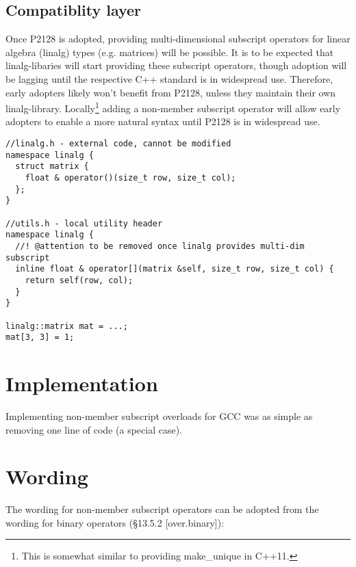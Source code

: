 \subsection{Compatiblity layer}
Once P2128 is adopted, providing multi\hyp dimensional subscript operators for linear algebra (linalg) types (e.g. matrices) will be possible.
It is to be expected that linalg\hyp libaries will start providing these subscript operators, though adoption will be lagging until the respective C++ standard is in widespread use.
Therefore, early adopters likely won't benefit from P2128, unless they maintain their own linalg\hyp library.
Locally\footnote{This is somewhat similar to providing make_unique in C++11.} adding a non\hyp member subscript operator will allow early adopters to enable a more natural syntax until P2128 is in widespread use.

\begin{lstlisting}[style=Vc]
//linalg.h - external code, cannot be modified
namespace linalg {
  struct matrix {
    float & operator()(size_t row, size_t col);
  };
}

//utils.h - local utility header
namespace linalg {
  //! @attention to be removed once linalg provides multi-dim subscript
  inline float & operator[](matrix &self, size_t row, size_t col) {
    return self(row, col);
  }
}

linalg::matrix mat = ...;
mat[3, 3] = 1;

\end{lstlisting}

\section{Implementation}
Implementing non-member subscript overloads for GCC was as simple as removing one line of code (a special case).

\section{Wording}

The wording for non\hyp member subscript operators can be adopted from the wording for binary operators (§13.5.2 [over.binary]):

